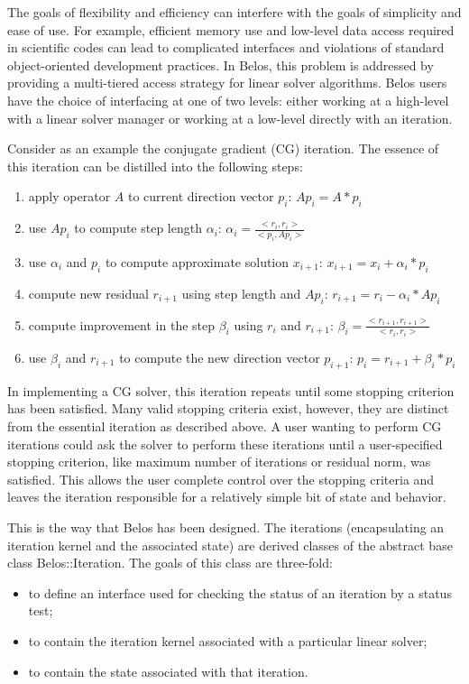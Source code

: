 The goals of flexibility and efficiency can interfere with the goals of simplicity and
ease of use. For example, efficient memory use and low-level data access required in
scientific codes can lead to complicated interfaces and violations of standard
object-oriented development practices.  In Belos, this problem is addressed by providing a 
multi-tiered access strategy for linear solver algorithms. Belos users have the choice of 
interfacing at one of two levels: either working at a high-level with a linear solver 
manager or working at a low-level directly with an iteration.

Consider as an example the conjugate gradient (CG) iteration. The essence of this iteration 
can be distilled into the following steps:
\begin{enumerate}
  \item apply operator $A$ to current direction vector $p_i$: $Ap_i = A*p_i$
  \item use $Ap_i$ to compute step length $\alpha_i$: $\alpha_i=\frac{<r_i,r_i>}{<p_i,Ap_i>}$
  \item use $\alpha_i$ and $p_i$ to compute approximate solution $x_{i+1}$: $x_{i+1}=x_i+\alpha_i*p_i$
  \item compute new residual $r_{i+1}$ using step length and $Ap_i$: $r_{i+1}=r_i-\alpha_i*Ap_i$
  \item compute improvement in the step $\beta_i$ using $r_i$ and $r_{i+1}$: $\beta_i=\frac{<r_{i+1},r_{i+1}>}{<r_i,r_i>}$
  \item use $\beta_i$ and $r_{i+1}$ to compute the new direction vector $p_{i+1}$: $p_i=r_{i+1}+\beta_i*p_i$
\end{enumerate}

In implementing a CG solver, this iteration repeats until some stopping criterion has 
been satisfied.  Many valid stopping criteria exist, however, they are distinct from 
the essential iteration as described above. A user wanting to perform CG iterations could 
ask the solver to perform these iterations until a user-specified stopping criterion, like
maximum number of iterations or residual norm, was 
satisfied.  This allows the user complete control over the stopping criteria and leaves 
the iteration responsible for a relatively simple bit of state and behavior.

This is the way that Belos has been designed. The iterations (encapsulating an
iteration kernel and the associated state) are derived classes of the abstract base class
Belos::Iteration. The goals of this class are three-fold:
\begin{itemize}
  \item to define an interface used for checking the status of an iteration by a status test;
  \item to contain the iteration kernel associated with a particular linear solver;
  \item to contain the state associated with that iteration.
\end{itemize}

